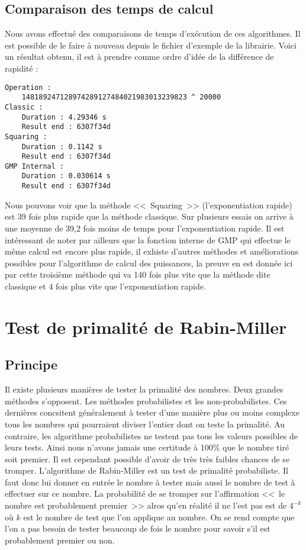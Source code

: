 \subsection{Comparaison des temps de calcul}
Nous avons effectué des comparaisons de temps d'exécution de ces algorithmes. Il est possible de le faire à nouveau depuis le fichier d'exemple de la librairie. Voici un résultat obtenu, il est à prendre comme ordre d'idée de la différence de rapidité :

\begin{lstlisting}[language={}]
Operation :
	148189247128974289127484021983013239823 ^ 20000
Classic :
	Duration : 4.29346 s
	Result end : 6307f34d
Squaring :
	Duration : 0.1142 s
	Result end : 6307f34d
GMP Internal :
	Duration : 0.030614 s
	Result end : 6307f34d
\end{lstlisting}

Nous pouvons voir que la méthode <<~Squaring~>> (l'exponentiation rapide) est 39 fois plus rapide que la méthode classique. Sur plusieurs essais on arrive à une moyenne de 39,2 fois moins de temps pour l'exponentiation rapide. Il est intéressant de noter par ailleurs que la fonction interne de GMP qui effectue le même calcul est encore plus rapide, il exhiste d'autres méthodes et améliorations possibles pour l'algorithme de calcul des puissances, la preuve en est donnée ici par cette troisième méthode qui va 140 fois plus vite que la méthode dite classique et 4 fois plus vite que l'exponentiation rapide.








\section{Test de primalité de Rabin-Miller}
\subsection{Principe}
Il existe plusieurs manières de tester la primalité des nombres. Deux grandes méthodes s'opposent. Les méthodes probabilistes et les non-probabilistes. Ces dernières concsitent généralement à tester d'une manière plus ou moins complexe tous les nombres qui pourraient diviser l'entier dont on teste la primalité. Au contraire, les algorithme probabilistes ne testent pas tous les valeurs possibles de leurs tests. Ainsi nous n'avons jamais une certitude à 100\% que le nombre tiré soit premier. Il est cependant possible d'avoir de très très faibles chances de se tromper. L'algorithme de Rabin-Miller est un test de primalité probabiliste. Il faut donc lui donner en entrée le nombre à tester mais aussi le nombre de test à effectuer sur ce nombre. La probabilité de se tromper sur l'affirmation <<~le nombre est probablement premier~>> alros qu'en réalité il ne l'est pas est de $4^{-k}$ où $k$ est le nombre de test que l'on applique au nombre. On se rend compte que l'on a pas besoin de tester beaucoup de fois le nombre pour savoir s'il est probablement premier ou non.\\

